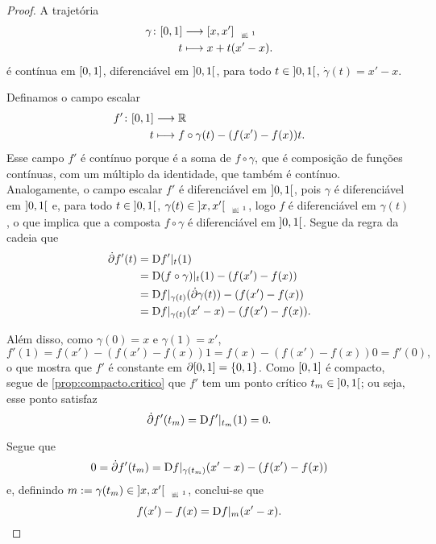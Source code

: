 \begin{proof}
A trajetória
	\begin{align*}
	\func{\gamma}{\intff{0}{1}}{\Sxger{x,x'}}{t}{x + t(x'-x)}.
	\end{align*}
é contínua em $\left[{0},{1}\right]$, diferenciável em $\left]{0},{1}\right[$, para todo $t \in \left]{0},{1}\right[$, $\dot \gamma(t) = x'-x$.

Definamos o campo escalar
	\begin{align*}
	{f'}\colon {\left[{0},{1}\right]} &\longrightarrow {\mathbb{R}} \\{t} &\longmapsto f \circ \gamma(t) - (f(x') - f(x))t.
	\end{align*}
Esse campo $f'$ é contínuo porque é a soma de $f \circ \gamma$, que é composição de funções contínuas, com um múltiplo da identidade, que também é contínuo. Analogamente, o campo escalar $f'$ é diferenciável em $\left]{0},{1}\right[$, pois $\gamma$ é diferenciável em $\left]{0},{1}\right[$ e, para todo $t \in \left]{0},{1}\right[$, $\gamma(t) \in \Sxgera{x,x'}$, logo $f$ é diferenciável em $\gamma(t)$, o que implica que a composta $f \circ \gamma$ é diferenciável em $\left]{0},{1}\right[$. Segue da regra da cadeia que
	\begin{align*}
	\dot{\partial} f'(t) &= \mathrm{D} f'|_t(1) \\
		&= \mathrm{D} (f \circ \gamma)|_t(1) - (f(x') - f(x)) \\
		&= \mathrm{D} f|_{\gamma(t)}(\dot{\partial} \gamma(t)) - (f(x') - f(x)) \\
		&= \mathrm{D} f|_{\gamma(t)}(x'-x) - (f(x') - f(x)).
	\end{align*}

Além disso, como $\gamma(0) = x$ e $\gamma(1) = x'$,
	\begin{equation*}
	f'(1) = f(x') - (f(x') - f(x))1 = f(x) - (f(x') - f(x))0 = f'(0),
	\end{equation*}
o que mostra que $f'$ é constante em $\partial{\left[{0},{1}\right]} = \{0,1\}$.
Como $\left[{0},{1}\right]$ é compacto, segue de \ref{prop:compacto.critico} que $f'$ tem um ponto crítico $t_m \in \left]{0},{1}\right[$; ou seja, esse ponto satisfaz
	\begin{equation*}
	\dot{\partial} f'(t_m) = \mathrm{D} f'|_{t_m}(1) = 0.
	\end{equation*}

Segue que
	\begin{equation*}
	0 = \dot{\partial} f'(t_m) = \mathrm{D} f|_{\gamma(t_m)}(x'-x) - (f(x') - f(x))
	\end{equation*}
e, definindo $m := \gamma(t_m) \in \Sxgera{x,x'}$, conclui-se que
	\begin{equation*}
	f(x') - f(x) = \mathrm{D} f|_m(x'-x).
	\qedhere
	\end{equation*}
\end{proof}

